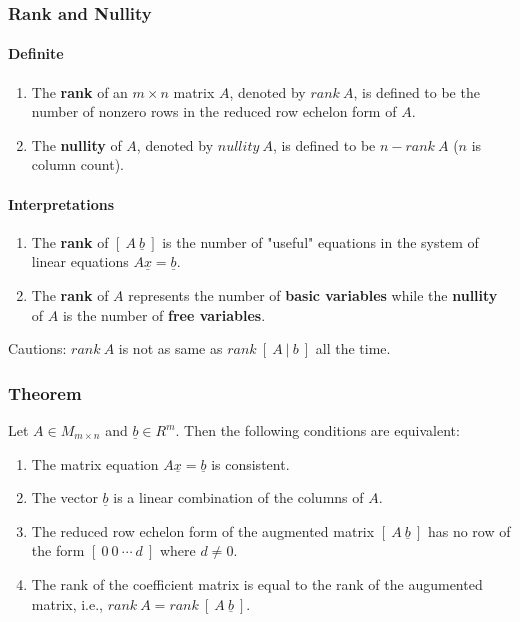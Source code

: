 \documentclass[14pt]{article}
\begin{document}
\begin{CJK}{UTF8}{min}
\subsubsection{Rank and Nullity}
\paragraph{Definite}
\begin{enumerate}
\item The \textbf{rank} of an $m \times n$ matrix $A$, denoted by $rank\ A$, is defined to be the number of nonzero rows in the reduced row echelon form of $A$.
\item The \textbf{nullity} of $A$, denoted by $nullity\ A$, is defined to be $n - rank\ A$ ($n$ is column count).
\end{enumerate}
\paragraph{Interpretations}
\begin{enumerate}
\item The \textbf{rank} of $[\ A\ \underline{b}\ ]$ is the number of "useful" equations in the system of linear equations $A\underline{x}=\underline{b}$.
\item The \textbf{rank} of $A$ represents the number of \textbf{basic variables} while the \textbf{nullity} of $A$ is the number of \textbf{free variables}.
\end{enumerate}
Cautions: $rank\ A$ is not as same as $rank\ [\ A\ |\ b\ ]$ all the time.
\subsubsection{Theorem}
Let $A \in M_{m \times n}$ and $\underline{b} \in R^m$. Then the following conditions are equivalent:
\begin{enumerate}
\item The matrix equation $A\underline{x}=\underline{b}$ is consistent.
\item The vector $\underline{b}$ is a linear combination of the columns of $A$.
\item The reduced row echelon form of the augmented matrix $[\ A\ \underline{b}\ ]$ has no row of the form $[\ 0\ 0\ \cdots \ d\ ]$ where $d \neq 0$.
\item The rank of the coefficient matrix is equal to the rank of the augumented matrix, i.e., $rank\ A = rank\ [\ A\ \underline{b}\ ]$.
\end{enumerate}


\end{CJK}
\end{document}

